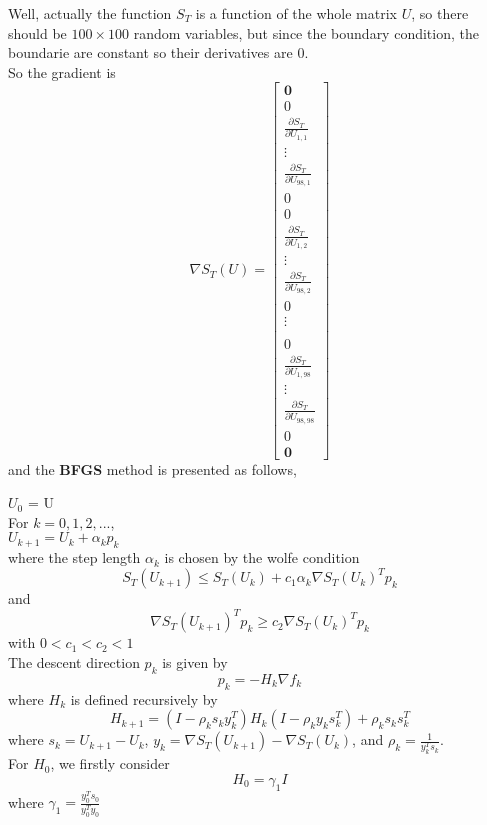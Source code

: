 \documentclass{article}
\begin{document}
\noindent
Well, actually the function $S_T$ is a function of the whole matrix $U$, so there should be $100 \times 100$ random variables, but since the boundary condition, the boundarie are constant so their derivatives are $0$.\\
So the gradient is
\[
\nabla S_T(U) =
\begin{bmatrix} 
   \mathbf{0} \\ 0 \\ \frac{\partial S_T}{\partial U_{1,1}} \\ \vdots \\ \frac{\partial S_T}{\partial U_{98,1}} \\ 0 \\ 0 \\ \frac{\partial S_T}{\partial U_{1,2}} \\ \vdots \\ \frac{\partial S_T}{\partial U_{98,2}} \\ 0 \\ \vdots \\ \\ 0 \\ \frac{\partial S_T}{\partial U_{1,98}} \\ \vdots \\ \frac{\partial S_T}{\partial U_{98,98}} \\ 0 \\ \mathbf{0}
\end{bmatrix}
\]
and the \textbf{BFGS} method is presented as follows,

$U_0$ = U\\
For $k = 0,1,2,...$,\\
$U_{k+1} = U_k + \alpha_k p_k$\\
where the step length $\alpha_k$ is chosen by the wolfe condition
\[
S_T(U_{k+1}) \leq S_T(U_k) + c_1 \alpha_k \nabla S_T(U_k)^T p_k
\]
and 
\[
\nabla S_T(U_{k+1})^T p_k \geq c_2 \nabla S_T(U_k)^T p_k
\]
with $0 < c_1 < c_2 < 1$\\
The descent direction $p_k$ is given by $$p_k = -H_k \nabla f_k$$ where $H_k$ is defined recursively by$$H_{k+1} = (I - \rho_k s_k y_k^T)H_k(I - \rho_k y_k s_k^T) + \rho_k s_k s_k^T$$ where $s_k = U_{k+1} - U_k$, $y_k = \nabla S_T(U_{k+1}) - \nabla S_T(U_k)$, and $\rho_k = \frac{1}{y_k^T s_k}$.\\
For $H_0$, we firstly consider $$H_0 = \gamma_1 I$$ where $\gamma_1 = \frac{y_0^Ts_0}{y_0^Ty_0}$
\end{document}
